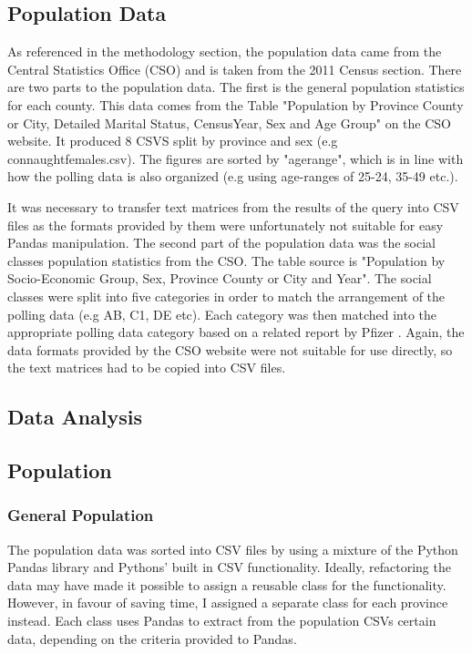 \subsection{Population Data}
As referenced in the methodology section, the population data came from the Central Statistics Office (CSO) and is taken from the 2011 Census section. There are two parts to the population data. The first is the general population statistics for each county. This data comes from the Table "Population by Province County or City, Detailed Marital Status, CensusYear, Sex and Age Group" on the CSO website. It produced 8 CSVS split by province and sex (e.g connaught\textunderscore females.csv). The figures are sorted by "age\textunderscore range", which is in line with how the polling data is also organized (e.g using age-ranges of 25-24, 35-49 etc.).

It was necessary to transfer text matrices from the results of the query into CSV files as the formats provided by them were unfortunately not suitable for easy Pandas manipulation. The second part of the population data was the social classes population statistics from the CSO. The table source is "Population by Socio-Economic Group, Sex, Province County or City and Year". The social classes were split into five categories in order to match the arrangement of the polling data (e.g AB, C1, DE etc). Each category was then matched into the appropriate polling data category based on a related report by Pfizer \cite{pfizer}. Again, the data formats provided by the CSO website were not suitable for use directly, so the text matrices had to be copied into CSV files.
\subsection{Data Analysis}
\subsection{Population}
\subsubsection{General Population}
The population data was sorted into CSV files by using a mixture of the Python Pandas library and Pythons’ built in CSV functionality. Ideally, refactoring the data may have made it possible to assign a reusable class for the functionality. However, in favour of saving time, I assigned a separate class for each province instead. Each class uses Pandas to extract from the population CSVs certain data, depending on the criteria provided to Pandas. 

